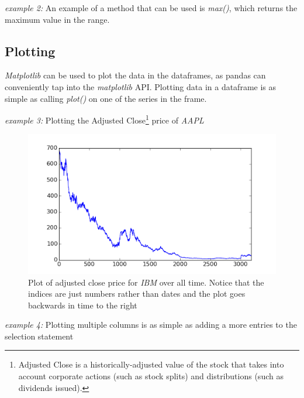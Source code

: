 \noindent\begin{minipage}{\linewidth}
\noindent\textit{example 2:} An example of a method that can be used is \textit{max()}, which returns the maximum value in the range.\\

\end{minipage}

\subsection{Plotting}
\noindent \textit{Matplotlib} can be used to plot the data in the dataframes, as pandas can conveniently tap into the \textit{matplotlib} API. Plotting data in a dataframe is as simple as calling \textit{plot()} on one of the series in the frame.\\

\noindent\begin{minipage}{\linewidth}
\noindent\textit{example 3:} Plotting the Adjusted Close\footnote{Adjusted Close is a historically-adjusted value of the stock that takes into account corporate actions (such as stock splits) and distributions (such as dividends issued).} price of \textit{AAPL}

\end{minipage}

\begin{figure}
	\centering
	\includegraphics[width=\textwidth]{images/adj_close.png}
    \caption{Plot of adjusted close price for \textit{IBM} over all time. Notice that the indices are just numbers rather than dates and the plot goes backwards in time to the right}
\end{figure}

\noindent\begin{minipage}{\linewidth}

\noindent\textit{example 4:} Plotting multiple columns is as simple as adding a more entries to the selection statement


\end{minipage}

